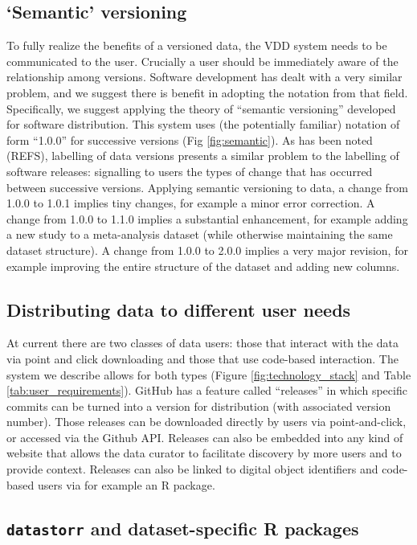 \documentclass[a4paper,11pt]{article}
\begin{document}
\subsection{`Semantic' versioning}

To fully realize the benefits of a versioned data, the VDD system needs to be communicated to the user.  Crucially a user should be immediately aware of the relationship among versions.  Software development has dealt with a very similar problem, and we suggest there is benefit in adopting the notation from that field.  Specifically, we suggest applying the theory of ``semantic versioning'' developed for software distribution. This system uses (the potentially familiar) notation of form ``1.0.0'' for successive versions (Fig \ref{fig:semantic}). As has been noted (REFS), labelling of data versions presents a similar problem to the labelling of software releases: signalling to users the types of change that has occurred between successive versions. Applying semantic versioning to data, a change from 1.0.0 to 1.0.1 implies tiny changes, for example a minor error correction. A change from 1.0.0 to 1.1.0 implies a substantial enhancement, for example adding a new study to a meta-analysis dataset (while otherwise maintaining the same dataset structure). A change from 1.0.0 to 2.0.0 implies a very major revision, for example improving the entire structure of the dataset and adding new columns.


\subsection{Distributing data to different user needs}

At current there are two classes of data users: those that  interact with the data via point and click downloading and those that use code-based interaction.  The system we describe allows for both types (Figure \ref{fig:technology_stack} and Table \ref{tab:user_requirements}).  GitHub has a feature called ``releases'' in which specific commits can be turned into a version for distribution (with associated version number).  Those releases can be downloaded directly by users via point-and-click, or accessed via the Github API. Releases can also be embedded into any kind of website that allows the data curator to facilitate discovery by more users and to provide context.  Releases can also be linked to digital object identifiers and code-based users via for example an R package.

\subsection{\texttt{datastorr} and dataset-specific R packages}
\end{document}
